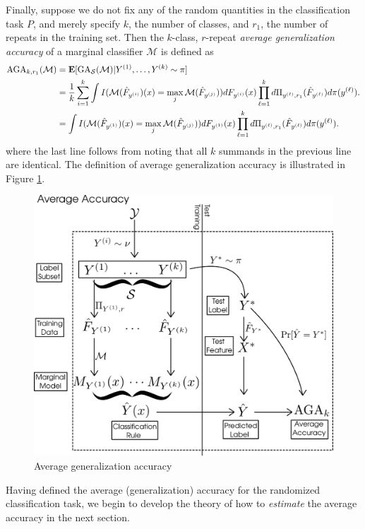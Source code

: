 \documentclass[12pt]{article}
\begin{document}
Finally, suppose we do not fix any of the random quantities in the
classification task $P$, and merely specify $k$, the number of
classes, and $r_1$, the number of repeats in the training set.  
Then the $k$-class, $r$-repeat \emph{average generalization accuracy} of
a marginal classifier $\mathcal{M}$ is defined as
\begin{align*}
\text{AGA}_{k,r_1}(\mathcal{M}) &= \textbf{E}[\text{GA}_{\mathcal{S}}(\mathcal{M})|Y^{(1)}, \hdots, Y^{(k)} \sim \pi]
\\&= \frac{1}{k} \sum_{i=1}^k \int
I(\mathcal{M}(\hat{F}_{y^{(i)}})(x) = \max_j
\mathcal{M}(\hat{F}_{y^{(j)}})) dF_{y^{(i)}}(x) \prod_{\ell=1}^k
d\Pi_{y^{(\ell)}, r_1}(\hat{F}_{y^{(\ell)}}) d\pi(y^{(\ell)}).
\\&= \int
I(\mathcal{M}(\hat{F}_{y^{(1)}})(x) = \max_j
\mathcal{M}(\hat{F}_{y^{(j)}})) dF_{y^{(1)}}(x) \prod_{\ell=1}^k
d\Pi_{y^{(\ell)}, r_1}(\hat{F}_{y^{(\ell)}}) d\pi(y^{(\ell)}).
\end{align*}
where the last line follows from noting that all $k$ summands in the previous line are identical.
The definition of average generalization accuracy is illustrated in Figure \ref{fig:average_risk}.

\begin{figure}[h]
\centering
\includegraphics[scale = 0.3]{average_risk.png}
\caption{Average generalization accuracy}\label{fig:average_risk}
\end{figure}

Having defined the average (generalization) accuracy for the randomized classification
task, we begin to develop the theory of how to \emph{estimate} the
average accuracy in the next section.
\end{document}
